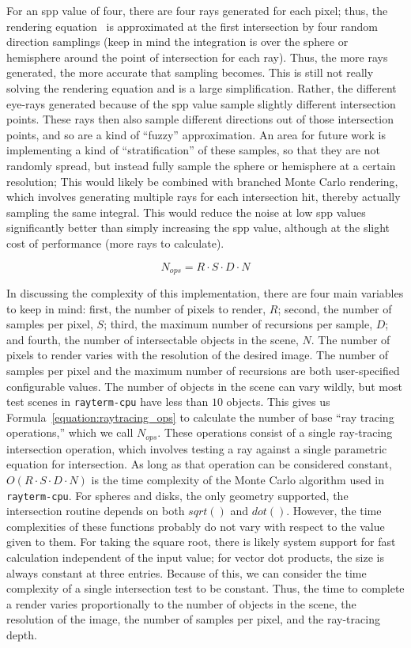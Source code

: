 For an spp value of four, there are four rays generated for each pixel; thus, the rendering equation~\cite{kajiya1986rendering} is approximated at the first intersection by four random direction samplings (keep in mind the integration is over the sphere or hemisphere around the point of intersection for each ray).
Thus, the more rays generated, the more accurate that sampling becomes.
This is still not really solving the rendering equation and is a large simplification.
Rather, the different eye-rays generated because of the spp value sample slightly different intersection points.
These rays then also sample different directions out of those intersection points, and so are a kind of ``fuzzy'' approximation.
An area for future work is implementing a kind of ``stratification'' of these samples, so that they are not randomly spread, but instead fully sample the sphere or hemisphere at a certain resolution;
This would likely be combined with branched Monte Carlo rendering, which involves generating multiple rays for each intersection hit, thereby actually sampling the same integral.
This would reduce the noise at low spp values significantly better than simply increasing the spp value, although at the slight cost of performance (more rays to calculate).

\begin{equation}
\label{equation:raytracing_ops}
  N_{ops} = R \cdot S \cdot D \cdot N
\end{equation}

In discussing the complexity of this implementation, there are four main variables to keep in mind: first, the number of pixels to render, $R$; second, the number of samples per pixel, $S$; third, the maximum number of recursions per sample, $D$; and fourth, the number of intersectable objects in the scene, $N$.
The number of pixels to render varies with the resolution of the desired image.
The number of samples per pixel and the maximum number of recursions are both user-specified configurable values.
The number of objects in the scene can vary wildly, but most test scenes in \texttt{rayterm-cpu} have less than $10$ objects.
This gives us Formula~\ref{equation:raytracing_ops} to calculate the number of base ``ray tracing operations,'' which we call $N_{ops}$.
These operations consist of a single ray-tracing intersection operation, which involves testing a ray against a single parametric equation for intersection.
As long as that operation can be considered constant, $O(R \cdot S \cdot D \cdot N)$ is the time complexity of the Monte Carlo algorithm used in \texttt{rayterm-cpu}.
For spheres and disks, the only geometry supported, the intersection routine depends on both $sqrt()$ and $dot()$.
However, the time complexities of these functions probably do not vary with respect to the value given to them.
For taking the square root, there is likely system support for fast calculation independent of the input value; for vector dot products, the size is always constant at three entries.
Because of this, we can consider the time complexity of a single intersection test to be constant.
Thus, the time to complete a render varies proportionally to the number of objects in the scene, the resolution of the image, the number of samples per pixel, and the ray-tracing depth.

